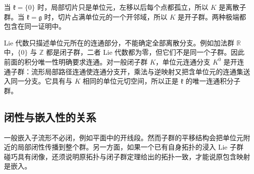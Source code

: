 当 \(\mathfrak k=\{0\}\) 时，局部切片只是单位元，左移以后每个点都孤立，所以 \(K\) 是离散子群。当 \(\mathfrak k=\mathfrak g\) 时，切片占满单位元的一个开邻域，所以 \(K\) 是开子群。两种极端都包含在同一证明中。

\ProseParagraphBreak

Lie 代数只描述单位元所在的连通部分，不能确定全部离散分支。例如加法群 \(\mathbb R\) 中，\(\{0\}\) 与 \(\mathbb Z\) 都是闭子群，二者 Lie 代数都为零，但它们不是同一个子群。因此前面的积分唯一性明确要求连通。对一般闭子群 \(K\)，单位元连通分支 \(K^0\) 是开连通子群：流形局部路径连通使连通分支开，乘法与逆映射又把含单位元的连通集送入同一分支。它具有与 \(K\) 相同的单位元切空间，所以正是 \(\mathfrak k\) 的唯一连通积分子群。

\subsection{闭性与嵌入性的关系}
\label{g1:subsec:1603:04}

一般嵌入子流形不必闭，例如平面中的开线段。然而子群的平移结构会把单位元附近的局部闭性传播到整个群。另一方面，如果一个已有自身拓扑的浸入 Lie 子群碰巧具有闭像，还须说明原拓扑与闭子群定理给出的拓扑一致，才能说原包含映射是嵌入。

